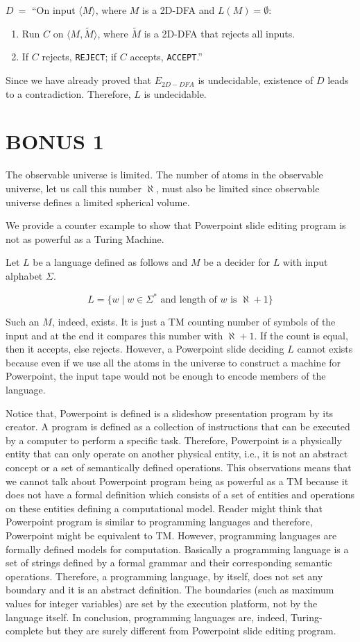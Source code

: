\documentclass[12pt]{article}
\begin{document}
$D \ =$ ``On input $\langle M \rangle$, where $M$ is a 2D-DFA and $L(M) = \emptyset$:
\begin{enumerate}[leftmargin=2.50cm]
	\item Run $C$ on $\langle M, \tilde{M} \rangle$, where $\tilde{M}$ is a 2D-DFA that rejects all inputs.
	\item If $C$ rejects, \texttt{REJECT}; if $C$ accepts, \texttt{ACCEPT}.”
\end{enumerate}

Since we have already proved that $E_{2D-DFA}$ is undecidable, existence of $D$ leads to a contradiction. Therefore, $L$ is undecidable.

\section*{BONUS 1}

The observable universe is limited. The number of atoms in the observable universe, let us call this number $\aleph$, must also be limited since observable universe defines a limited spherical volume.

We provide a counter example to show that Powerpoint slide editing program is not as powerful as a Turing Machine.

Let $L$ be a language defined as follows and $M$ be a decider for $L$ with input alphabet $\Sigma$.

\[
L = \{w \mid w \in \Sigma^* \text{ and length of } w \text{ is } \aleph + 1\}
\]

Such an $M$, indeed, exists. It is just a TM counting number of symbols of the input and at the end it compares this number with $\aleph + 1$. If the count is equal, then it accepts, else rejects. However, a Powerpoint slide deciding $L$ cannot exists because even if we use all the atoms in the universe to construct a machine for Powerpoint, the input tape would not be enough to encode members of the language.

Notice that, Powerpoint is defined is a slideshow presentation program by its creator. A program is defined as a collection of instructions that can be executed by a computer to perform a specific task. Therefore, Powerpoint is a physically entity that can only operate on another physical entity, i.e., it is not an abstract concept or a set of semantically defined operations. This observations means that we cannot talk about Powerpoint program being as powerful as a TM because it does not have a formal definition which consists of a set of entities and operations on these entities defining a computational model. Reader might think that Powerpoint program is similar to programming languages and therefore, Powerpoint might be equivalent to TM. However, programming languages are formally defined models for computation. Basically a programming language is a set of strings defined by a formal grammar and their corresponding semantic operations. Therefore, a programming language, by itself, does not set any boundary and it is an abstract definition. The boundaries (such as maximum values for integer variables) are set by the execution platform, not by the language itself. In conclusion, programming languages are, indeed, Turing-complete but they are surely different from Powerpoint slide editing program.
\end{document}
